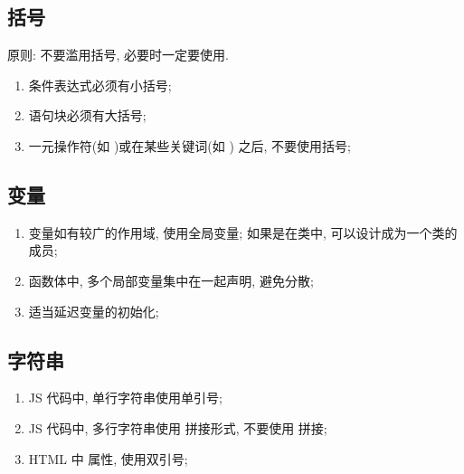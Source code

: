 \documentclass[letterpaper,10pt,english]{sphinxmanual}
\begin{document}
\subsection{括号}
\label{styleguide/js-style-rules:id6}
原则: 不要滥用括号, 必要时一定要使用.
\begin{enumerate}
\item {}
 条件表达式必须有小括号;

\item {}
语句块必须有大括号;

\item {}
一元操作符(如 )或在某些关键词(如 ) 之后, 不要使用括号;

\end{enumerate}


\subsection{变量}
\label{styleguide/js-style-rules:id7}\begin{enumerate}
\item {}
变量如有较广的作用域, 使用全局变量; 如果是在类中, 可以设计成为一个类的成员;

\item {}
函数体中, 多个局部变量集中在一起声明, 避免分散;

\item {}
适当延迟变量的初始化;

\end{enumerate}


\subsection{字符串}
\label{styleguide/js-style-rules:id8}\begin{enumerate}
\item {}
JS 代码中, 单行字符串使用单引号;

\item {}
JS 代码中, 多行字符串使用 \code{+} 拼接形式, 不要使用 \code{\textbackslash{}} 拼接;

\item {}
HTML 中  属性, 使用双引号;

\end{enumerate}
\end{document}
